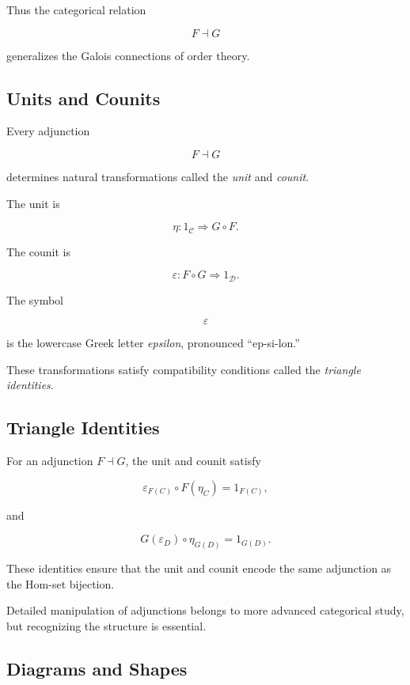 Thus the categorical relation

\[ F\dashv G \]

generalizes the Galois connections of order theory.

\subsection{Units and Counits}
\label{subsec:units-counits}

Every adjunction

\[ F\dashv G \]

determines natural transformations called the \emph{unit} and
\emph{counit}.

The unit is

\[ \eta:1_{\mathcal C}\Rightarrow G\circ F. \]

The counit is

\[ \varepsilon:F\circ G\Rightarrow1_{\mathcal D}. \]

The symbol

\[ \varepsilon \]

is the lowercase Greek letter \emph{epsilon}, pronounced ``ep-si-lon.''

These transformations satisfy compatibility conditions called the
\emph{triangle identities}.

\subsection{Triangle Identities}
\label{subsec:triangle-identities}

For an adjunction \(F\dashv G\), the unit and counit satisfy

\[ \varepsilon_{F(C)}\circ F(\eta_C)=1_{F(C)}, \]

and

\[ G(\varepsilon_D)\circ\eta_{G(D)}=1_{G(D)}. \]

These identities ensure that the unit and counit encode the same adjunction
as the Hom-set bijection.

Detailed manipulation of adjunctions belongs to more advanced categorical
study, but recognizing the structure is essential.

\subsection{Diagrams and Shapes}
\label{subsec:category-diagrams-shapes}


